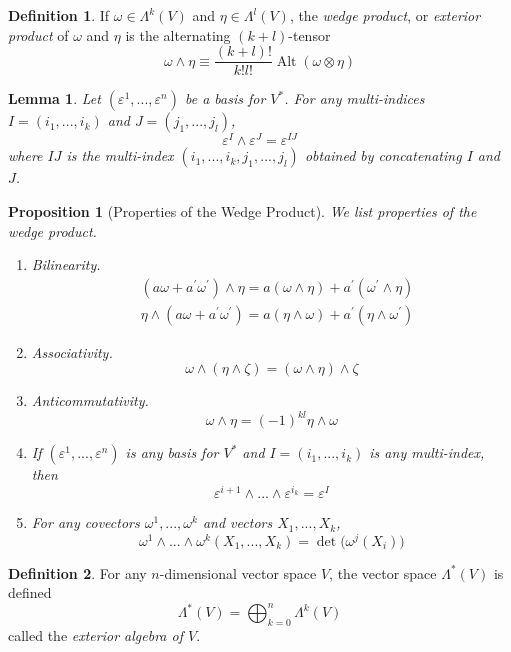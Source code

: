 \documentclass{article}
\DeclareMathOperator{\Alt}{Alt}
\newtheorem{proposition}[theorem]{Proposition}
\newtheorem{lemma}[theorem]{Lemma}
\theoremstyle{remark}
\theoremstyle{definition}
\newtheorem{definition}{Definition}[section]
\begin{document}
    \begin{definition}
    If $\omega \in \Lambda^k (V)$ and $\eta \in \Lambda^l (V)$, the \textit{wedge product}, or \textit{exterior product} of $\omega$ and $\eta$ is the alternating $(k+l)$-tensor 
    \[\omega \wedge \eta \equiv \frac{(k+l)!}{k! l!} \Alt(\omega \otimes \eta)\]
    \end{definition}

    \begin{lemma}
    Let $(\varepsilon^1, ..., \varepsilon^n)$ be a basis for $V^*$. For any multi-indices $I = (i_1, ..., i_k)$ and $J = (j_1, ..., j_l)$, 
    \[\varepsilon^I \wedge \varepsilon^J = \varepsilon^{IJ}\]
    where $IJ$ is the multi-index $(i_1, ..., i_k, j_1, ..., j_l)$ obtained by concatenating $I$ and $J$. 
    \end{lemma}

    \begin{proposition}[Properties of the Wedge Product]
    We list properties of the wedge product. 
    \begin{enumerate}
        \item Bilinearity. 
        \begin{align*}
            & (a \omega + a^\prime \omega^\prime) \wedge \eta = a (\omega \wedge \eta) + a^\prime (\omega^\prime \wedge \eta) \\
            & \eta \wedge (a \omega + a^\prime \omega^\prime) = a (\eta \wedge \omega) + a^\prime (\eta \wedge \omega^\prime) 
        \end{align*}
        \item Associativity. 
        \[\omega \wedge (\eta \wedge \zeta) = (\omega \wedge \eta) \wedge \zeta\]
        \item Anticommutativity. 
        \[\omega \wedge \eta = (-1)^{kl} \eta \wedge \omega\]
        \item If $(\varepsilon^1, ..., \varepsilon^n)$ is any basis for $V^*$ and $I = (i_1,..., i_k)$ is any multi-index, then 
        \[\varepsilon^{i+1} \wedge ... \wedge \varepsilon^{i_k} = \varepsilon^I\]
        \item For any covectors $\omega^1, ..., \omega^k$ and vectors $X_1, ..., X_k$, 
        \[\omega^1 \wedge ... \wedge \omega^k (X_1, ..., X_k) = \det \big( \omega^j (X_i)\big) \]
    \end{enumerate}
    \end{proposition}

    \begin{definition}
    For any $n$-dimensional vector space $V$, the vector space $\Lambda^* (V)$ is defined
    \[\Lambda^* (V) = \bigoplus_{k=0}^n \Lambda^k (V)\]
    called the \textit{exterior algebra of $V$}. 
    \end{definition}
\end{document}
